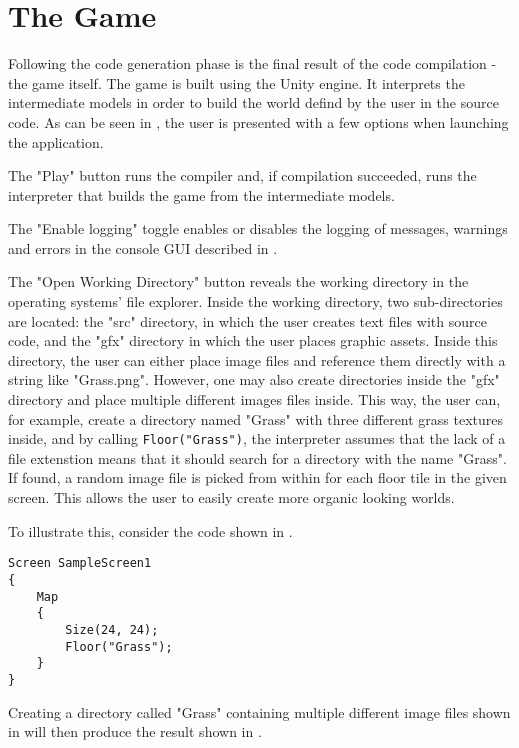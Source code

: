 \section{The Game}
Following the code generation phase is the final result of the code compilation - the game itself. 
The game is built using the Unity engine. It interprets the intermediate models in order to build the world defind by the user in the \dazel{} source code. As can be seen in , the user is presented with a few options when launching the application.

 
The "Play" button runs the \dazel{} compiler and, if compilation succeeded, runs the interpreter that builds the game from the intermediate models. 


The "Enable logging" toggle enables or disables the logging of messages, warnings and errors in the console GUI described in .


The "Open Working Directory" button reveals the working directory in the operating systems' file explorer.
Inside the working directory, two sub-directories are located: the "src" directory, in which the user creates text files with source code, and the "gfx" directory in which the user places graphic assets. Inside this directory, the user can either place image files and reference them directly with a string like "Grass.png". However, one may also create directories inside the "gfx" directory and place multiple different images files inside. This way, the user can, for example, create a directory named "Grass" with three different grass textures inside, and by calling \texttt{Floor("Grass")}, the interpreter assumes that the lack of a file extenstion means that it should search for a directory with the name "Grass". If found, a random image file is picked from within for each floor tile in the given screen. This allows the user to easily create more organic looking worlds. 


To illustrate this, consider the \dazel{} code shown in .
\begin{lstlisting}[language=CSharp, caption={}, label={lst:DazelGrassExample},escapechar=|]
Screen SampleScreen1 
{
	Map 
	{
		Size(24, 24);
		Floor("Grass");
	}
}
\end{lstlisting}

Creating a directory called "Grass" containing multiple different image files shown in  will then produce the result shown in .

